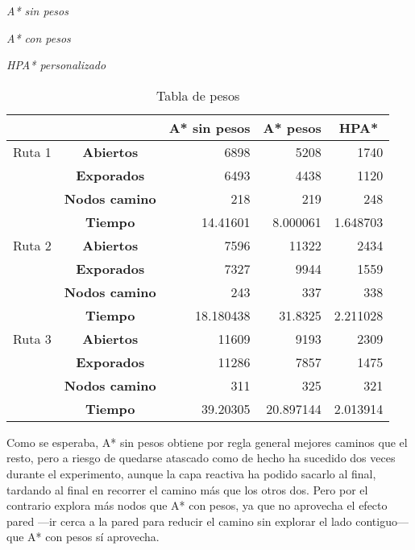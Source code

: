 \documentclass{article}
\newcommand{\img}[1]{
\noindent\makebox[\textwidth][c]{\texttt{[image: \#1]}}%
}
\begin{document}
\newpage

\emph{A* sin pesos}

\img{A-sin-R2}

\emph{A* con pesos}

\img{A-pesos-R2}

\emph{HPA* personalizado}

\img{A-HPA-R2}

\begin{table}[htbp]
\caption{Tabla de pesos}
\begin{tabular}{|c|c|r|r|r|}
\hline
 &  & \multicolumn{1}{c|}{\textbf{A* sin pesos}} & \multicolumn{1}{c|}{\textbf{A* pesos}} & \multicolumn{1}{c|}{\textbf{HPA*}} \\ \hline
\multicolumn{ 1}{|c|}{Ruta 1} & \textbf{Abiertos} & 6898 & 5208 & 1740 \\ \cline{ 2- 5}
\multicolumn{ 1}{|c|}{} & \textbf{Exporados} & 6493 & 4438 & 1120 \\ \cline{ 2- 5}
\multicolumn{ 1}{|c|}{} & \textbf{Nodos camino} & 218 & 219 & 248 \\ \cline{ 2- 5}
\multicolumn{ 1}{|c|}{} & \textbf{Tiempo} & 14.41601 & 8.000061 & 1.648703 \\ \hline
\multicolumn{ 1}{|c|}{Ruta 2} & \textbf{Abiertos} & 7596 & 11322 & 2434 \\ \cline{ 2- 5}
\multicolumn{ 1}{|c|}{} & \textbf{Exporados} & 7327 & 9944 & 1559 \\ \cline{ 2- 5}
\multicolumn{ 1}{|c|}{} & \textbf{Nodos camino} & 243 & 337 & 338 \\ \cline{ 2- 5}
\multicolumn{ 1}{|c|}{} & \textbf{Tiempo} & 18.180438 & 31.8325 & 2.211028 \\ \hline
\multicolumn{ 1}{|c|}{Ruta 3} & \textbf{Abiertos} & 11609 & 9193 & 2309 \\ \cline{ 2- 5}
\multicolumn{ 1}{|c|}{} & \textbf{Exporados} & 11286 & 7857 & 1475 \\ \cline{ 2- 5}
\multicolumn{ 1}{|c|}{} & \textbf{Nodos camino} & 311 & 325 & 321 \\ \cline{ 2- 5}
\multicolumn{ 1}{|c|}{} & \textbf{Tiempo} & 39.20305 & 20.897144 & 2.013914 \\ \hline
\end{tabular}
\end{table}

\newpage

Como se esperaba, A* sin pesos obtiene por regla general mejores caminos que el resto, pero a riesgo de quedarse atascado como de hecho ha sucedido dos veces durante el experimento, aunque la capa reactiva ha podido sacarlo al final, tardando al final en recorrer el camino más que los otros dos. Pero por el contrario explora más nodos que A* con pesos, ya que no aprovecha el efecto pared ---ir cerca a la pared para reducir el camino sin explorar el lado contiguo--- que A* con pesos sí aprovecha.
\end{document}
